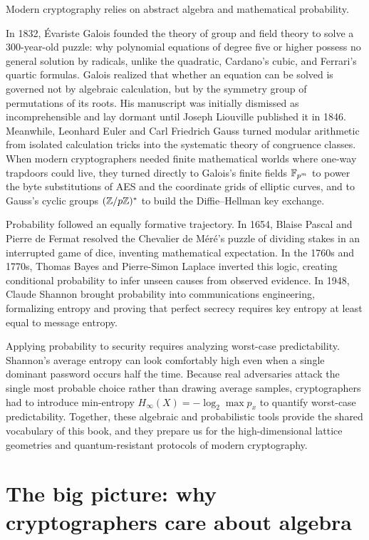 \begin{historybox}
Modern cryptography relies on abstract algebra and mathematical probability.

In 1832, \'{E}variste Galois founded the theory of group and field theory to solve a 300-year-old puzzle: why polynomial equations of degree five or higher possess no general solution by radicals, unlike the quadratic, Cardano's cubic, and Ferrari's quartic formulas. Galois realized that whether an equation can be solved is governed not by algebraic calculation, but by the symmetry group of permutations of its roots. His manuscript was initially dismissed as incomprehensible and lay dormant until Joseph Liouville published it in 1846. Meanwhile, Leonhard Euler and Carl Friedrich Gauss turned modular arithmetic from isolated calculation tricks into the systematic theory of congruence classes. When modern cryptographers needed finite mathematical worlds where one-way trapdoors could live, they turned directly to Galois's finite fields $\mathbb{F}_{p^m}$ to power the byte substitutions of AES and the coordinate grids of elliptic curves, and to Gauss's cyclic groups $(\mathbb{Z}/p\mathbb{Z})^{*}$ to build the Diffie--Hellman key exchange.

Probability followed an equally formative trajectory. In 1654, Blaise Pascal and Pierre de Fermat resolved the Chevalier de M\'{e}r\'{e}'s puzzle of dividing stakes in an interrupted game of dice, inventing mathematical expectation. In the 1760s and 1770s, Thomas Bayes and Pierre-Simon Laplace inverted this logic, creating conditional probability to infer unseen causes from observed evidence. In 1948, Claude Shannon brought probability into communications engineering, formalizing entropy and proving that perfect secrecy requires key entropy at least equal to message entropy. 

Applying probability to security requires analyzing worst-case predictability. Shannon's average entropy can look comfortably high even when a single dominant password occurs half the time. Because real adversaries attack the single most probable choice rather than drawing average samples, cryptographers had to introduce min-entropy $H_\infty(X) = -\log_2 \max p_x$ to quantify worst-case predictability. Together, these algebraic and probabilistic tools provide the shared vocabulary of this book, and they prepare us for the high-dimensional lattice geometries and quantum-resistant protocols of modern cryptography.
\end{historybox}

\section{The big picture: why cryptographers care about algebra}
\label{ch41:bigpicture}

